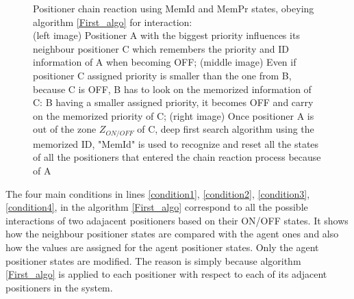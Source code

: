 \documentclass[]{spie}  %
\begin{document}
\begin{figure}[H]
\begin{minipage}[t]{5.4cm}
 			\label{ID_PR2}
 		\end{minipage}
 		\caption{\centering Positioner chain reaction using MemId and MemPr states, obeying algorithm \ref{First_algo} for interaction:\\
 			(left image) Positioner A with the biggest priority influences its neighbour positioner C which remembers the priority and ID information of A when becoming OFF; (middle image) Even if positioner C assigned priority is smaller than the one from B, because C is OFF, B has to look on the memorized information of C: B having a smaller assigned priority, it becomes OFF and carry on the memorized priority of C; (right image) Once positioner A is out of the zone $Z_{ON/OFF}$ of C, deep first search algorithm using the memorized ID, "MemId" is used to recognize and reset all the states of all the positioners that entered the chain reaction process because of A }
 		\label{ID_PR}
 	\end{figure}
	   The four main conditions in lines \ref{condition1}, \ref{condition2}, \ref{condition3}, \ref{condition4}, in the algorithm \ref{First_algo} correspond to all the possible interactions of two adajacent positioners based on their ON/OFF states. It shows how the neighbour positioner states are compared with the agent ones and also how the values are assigned for the agent positioner states. Only the agent positioner states are modified. The reason is simply because algorithm \ref{First_algo} is applied to each positioner with respect to each of its adjacent positioners in the system.\\
	 
\end{document}
